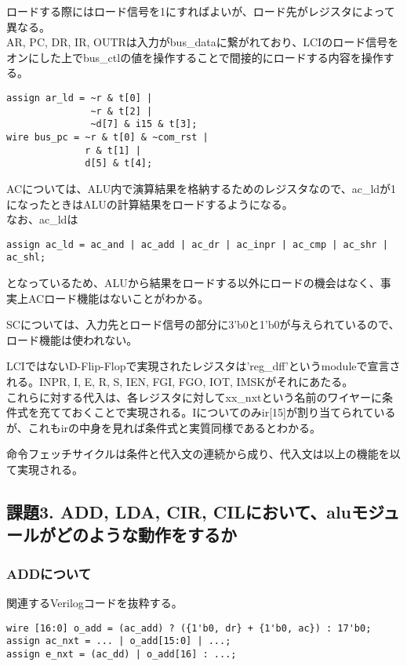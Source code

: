 \documentclass{jsarticle}
\begin{document}
ロードする際にはロード信号を1にすればよいが、ロード先がレジスタによって異なる。\\
AR, PC, DR, IR, OUTRは入力がbus\_dataに繋がれており、LCIのロード信号をオンにした上でbus\_ctlの値を操作することで間接的にロードする内容を操作する。

\begin{lstlisting}[caption=$\overline R \cdot T(0) \Rightarrow AR \leftarrow PC$の場合]
assign ar_ld = ~r & t[0] |
               ~r & t[2] |
               ~d[7] & i15 & t[3];
wire bus_pc = ~r & t[0] & ~com_rst |
              r & t[1] |
              d[5] & t[4];
\end{lstlisting}
ACについては、ALU内で演算結果を格納するためのレジスタなので、ac\_ldが1になったときはALUの計算結果をロードするようになる。\\
なお、ac\_ldは
\begin{lstlisting}
assign ac_ld = ac_and | ac_add | ac_dr | ac_inpr | ac_cmp | ac_shr | ac_shl;
\end{lstlisting}
となっているため、ALUから結果をロードする以外にロードの機会はなく、事実上ACロード機能はないことがわかる。

SCについては、入力先とロード信号の部分に3'b0と1'b0が与えられているので、ロード機能は使われない。

LCIではないD-Flip-Flopで実現されたレジスタは'reg\_dff'というmoduleで宣言される。INPR, I, E, R, S, IEN, FGI, FGO, IOT, IMSKがそれにあたる。\\
これらに対する代入は、各レジスタに対してxx\_nxtという名前のワイヤーに条件式を充てておくことで実現される。Iについてのみir[15]が割り当てられているが、これもirの中身を見れば条件式と実質同様であるとわかる。

命令フェッチサイクルは条件と代入文の連続から成り、代入文は以上の機能を以て実現される。

\subsection*{課題3. ADD, LDA, CIR, CILにおいて、aluモジュールがどのような動作をするか}

\subsubsection*{ADDについて}
関連するVerilogコードを抜粋する。
\begin{lstlisting}
wire [16:0] o_add = (ac_add) ? ({1'b0, dr} + {1'b0, ac}) : 17'b0;
assign ac_nxt = ... | o_add[15:0] | ...;
assign e_nxt = (ac_dd) | o_add[16] : ...;
\end{lstlisting}
\end{document}
